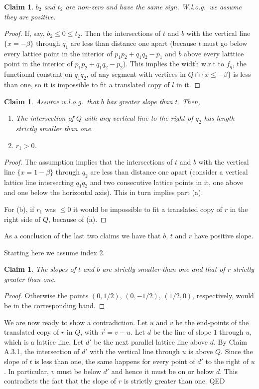 \documentclass{amsart}
\theoremstyle{plain}
\newtheorem{claim}[theorem]{Claim}
\theoremstyle{definition}
\begin{document}
\begin{claim}
$b_2$ and $t_2$ are non-zero and have the same sign. W.l.o.g.~we assume they are positive.
\end{claim}

\begin{proof}
If, say, $b_2 \le 0 \le t_2$. Then the intersections of $t$ and $b$ with the vertical line $\{x=-\beta\}$ through $q_1$ are less than distance one apart (because $t$ must go below every lattice point in the interior of $p_1p_2 + q_1q_2 - p_1$ and $b$ above every latttice point in the interior of $p_1p_2 + q_1q_2 - p_2$). This implies the width w.r.t to $f_q$, the functional constant on $q_1q_2$, of any segment with vertices in $Q \cap \{x\le  -\beta\}$ is less than one, so it is impossible to fit a translated copy of $l$ in it.
\end{proof}

\begin{claim}
Assume w.l.o.g.~that $b$ has greater slope than $t$. Then, 
\begin{enumerate}
\item The intersection of $Q$ with any vertical line to the right of $q_2$ has length strictly smaller than one.
\item $r_1>0$.
\end{enumerate}
\end{claim}

\begin{proof}
The assumption implies that the intersections of $t$ and $b$ with the vertical line $\{x=1-\beta\}$ through $q_2$ are less than distance one apart (consider a vertical lattice line intersecting $q_1q_2$ and two consecutive lattice points in it, one above and one below the horizontal axis). This in turn implies part (a). 

For (b), if $r_1$ was $\le 0$ it would be impossible to fit a translated copy of $r$ in the right side of $Q$, because of (a).
\end{proof}

As a conclusion of the last two claims we have that $b$, $t$ and $r$ have positive slope.

Starting here we assume index 2.

\begin{claim}
The slopes of $t$ and $b$ are strictly smaller than one and that of $r$ strictly greater than one.
\end{claim}

\begin{proof}
Otherwise the points $(0,1/2)$, $(0,-1/2)$, $(1/2,0)$, respectively, would be in the corresponding band.
\end{proof}

We are now ready to show a contradiction. Let $u$ and $v$ be the end-points of the translated copy of $r$ in $Q$, with $\vec r=v-u$. Let $d$ be the line of slope $1$ through $u$, which is a lattice line. Let $d'$ be the next parallel lattice line above $d$. By Claim A.3.1, the intersection of $d'$ with the vertical line through $u$ is above $Q$. Since the slope of $t$ is less than one, the same happens for every point of $d'$ to the right of $u$. In particular, $v$ must be below $d'$ and hence it must be on or below $d$. This contradicts the fact that the slope of $r$ is strictly greater than one. QED
\end{document}
